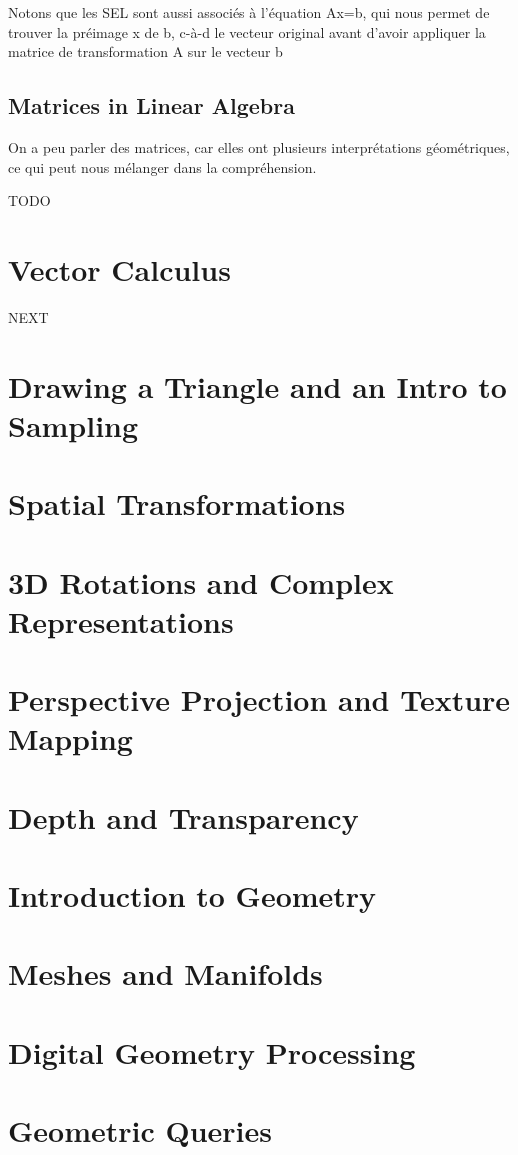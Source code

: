 \documentclass{article}
\begin{document}
Notons que les SEL sont aussi associés à l'équation Ax=b, qui nous
permet de trouver la préimage x de b, c-à-d le vecteur original avant
d'avoir appliquer la matrice de transformation A sur le vecteur b

\subsection{Matrices in Linear Algebra}

On a peu parler des matrices, car elles ont plusieurs interprétations
géométriques, ce qui peut nous mélanger dans la compréhension.

TODO

\section{Vector Calculus}
NEXT
\section{Drawing a Triangle and an Intro to Sampling}
\section{Spatial Transformations}
\section{3D Rotations and Complex Representations}
\section{Perspective Projection and Texture Mapping}
\section{Depth and Transparency}
\section{Introduction to Geometry}
\section{Meshes and Manifolds}
\section{Digital Geometry Processing}
\section{Geometric Queries}
\end{document}
